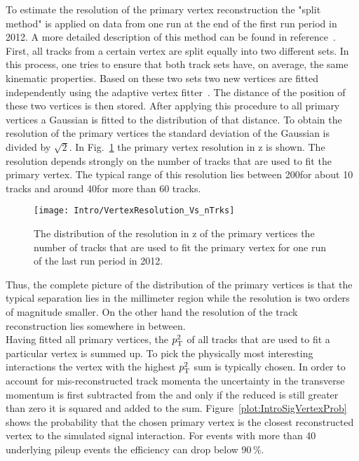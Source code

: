 To estimate the resolution of the primary vertex reconstruction the "split method" is applied on data from one run at the end of the first run period in 2012. A more detailed description of this method can be found in reference~. First, all tracks from a certain vertex are split equally into two different sets. In this process, one tries to ensure that both track sets have, on average, the same kinematic properties. Based on these two sets two new vertices are fitted independently using the adaptive vertex fitter~\cite{CMS-PAPER-TRK-11-001}. The distance of the position of these two vertices is then stored. After applying this procedure to all primary vertices a Gaussian is fitted to the distribution of that distance. To obtain the resolution of the primary vertices the standard deviation of the Gaussian is divided by $\sqrt{2}$. In Fig.~\ref{plot:IntroVertexRes} the primary vertex resolution in z is shown. The resolution depends strongly on the number of tracks that are used to fit the primary vertex. The typical range of this resolution lies between 200\mum for about 10 tracks and around 40\mum for more than 60 tracks.

\begin{figure}[Htb]
    \centering
    \texttt{[image: Intro/VertexResolution\_Vs\_nTrks]}
    \caption[Vertex resolution \vs number of used tracks]{The distribution of the resolution in z of the primary vertices \vs the number of tracks that are used to fit the primary vertex for one run of the last run period in 2012. \label{plot:IntroVertexRes}}
\end{figure}

Thus, the complete picture of the distribution of the primary vertices is that the typical separation lies in the millimeter region while the resolution is two orders of magnitude smaller. On the other hand the resolution of the track reconstruction lies somewhere in between.\\
Having fitted all primary vertices, the $p_{\mathrm{T}}^{2}$ of all tracks that are used to fit a particular vertex is summed up. To pick the physically most interesting interactions the vertex with the highest $p_{\mathrm{T}}^{2}$ sum is typically chosen. In order to account for mis-reconstructed track momenta the uncertainty in the transverse momentum is first subtracted from the \pt and only if the reduced \pt is still greater than zero it is squared and added to the sum. Figure~\ref{plot:IntroSigVertexProb} shows the probability that the chosen primary vertex is the closest reconstructed vertex to the simulated signal interaction. For events with more than 40 underlying pileup events the efficiency can drop below $90\,{}\%{}$.

